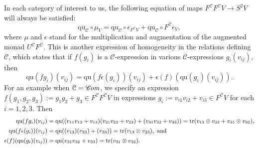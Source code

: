 \documentclass[11pt]{amsart} \renewcommand{\baselinestretch}{1.2}
\theoremstyle{plain}
\numberwithin{equation}{section} %
\theoremstyle{plain}
\numberwithin{equation}{chapter} %
\DeclareMathOperator{\trace}{tr}
\renewcommand{\to}{\longrightarrow}
\newcommand{\scrC}{\mathscr{C}}
\newcommand{\calc}{\mathcal{C}}
\newcommand{\quadratic}{\mathrm{qu}}
\newcommand{\algs}{{\scrC\!\textit{\normalfont\textit{om}}}}
\begin{document}
\begin{Pi-algebras and cohomology algebras}
In each category of interest to us, the following equation of maps $F^\calc F^\calc V\to S^2 V$ will always be satisfied:
\[\quadratic_\calc\circ\mu_V=\quadratic_\calc\circ \epsilon_{F^\calc V} +\quadratic_\calc\circ {F^\calc \epsilon_V},\]
where $\mu$  and $\epsilon$ stand for the multiplication and augmentation of the augmented monad $U^\calc F^\calc $. This is another expression of homogeneity in the relations defining $\calc$, which states that if  $f(g_i)$ is a $\calc$-expression in various $\calc$-expressions $g_i(v_{ij})$, then
\[\quadratic(fg_i)(v_{ij})=\quadratic(f\epsilon(g_i))(v_{ij})+\epsilon(f)(\quadratic(g_i)(v_{ij})).\]
 For an example when $\calc=\algs$, we specify an expression $f(g_1,g_2,g_3):=g_1g_2+g_3\in F^\calc F^\calc V$ in expressions $g_i:=v_{i1}v_{i2}+v_{i3}\in F^\calc V$ for each $i=1,2,3$. Then
\begin{alignat*}{2}
\textup{\small$\quadratic(fg_i)(v_{ij})={}$}
&
\textup{\small$\quadratic((v_{11}v_{12}+v_{13})(v_{21}v_{22}+v_{23})+(v_{31}v_{32}+v_{33}))=\trace(v_{13}\otimes v_{23}+v_{31}\otimes v_{32}),$}
\\
\textup{\small$\quadratic(f\epsilon(g_i))(v_{ij})={}$}
&
\textup{\small$\quadratic((v_{13})(v_{23})+(v_{33}))=\trace(v_{13}\otimes v_{23}),\textup{ and}$}
\\
\textup{\small$\epsilon(f)(\quadratic(g_i)(v_{ij}))={}$}
&
\textup{\small$\quadratic(v_{31}v_{32}+v_{33})=\trace(v_{31}\otimes v_{32}).$}
\end{alignat*}










\end{Pi-algebras and cohomology algebras}
\end{document}

